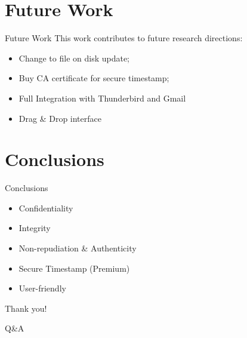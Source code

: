 \section{Future Work}
\begin{frame}{Future Work}
This work contributes to future research directions:
\begin{itemize}
	\item Change to file on disk update;
	\item Buy CA certificate for secure timestamp;
	\item Full Integration with Thunderbird and Gmail
	\item Drag \& Drop interface
\end{itemize}
\end{frame}


\section{Conclusions}
\begin{frame}{Conclusions}
\begin{itemize}
\item Confidentiality
\item Integrity
\item Non-repudiation \& Authenticity
\item Secure Timestamp (Premium)
\item User-friendly
\end{itemize}
\end{frame}
		
\begin{frame}
\begin{center}
\huge Thank you!
\vspace{0.5cm}

\Large Q\&A
\end{center}
\end{frame}


